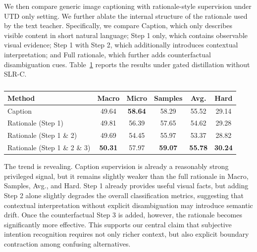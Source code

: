 We then compare generic image captioning with rationale-style supervision under UTD only setting. We further ablate the internal structure of the rationale used by the text teacher. Specifically, we compare Caption, which only describes visible content in short natural language; Step 1 only, which contains observable visual evidence; Step 1 with Step 2, which additionally introduces contextual interpretation; and Full rationale, which further adds counterfactual disambiguation cues. Table~\ref{tab:rationale_ablation} reports the results under gated distillation without SLR-C.
\begin{table}[htbp]
\centering
\caption{}
\label{tab:rationale_ablation}
\begin{tabular}{lccccc}
\hline
Method & Macro & Micro & Samples & Avg. & Hard \\
\hline
Caption & 49.64 & \textbf{58.64} & 58.29 & 55.52 & 29.14 \\
Rationale (Step 1) & 49.81 & 56.39 & 57.65 & 54.62 & 29.28 \\
Rationale (Step 1 \& 2) & 49.69 & 54.45 & 55.97 & 53.37 & 28.82 \\
Rationale (Step 1 \& 2 \& 3) & \textbf{50.31} & 57.97 & \textbf{59.07} & \textbf{55.78} & \textbf{30.24} \\
\hline
\end{tabular}
\end{table}

The trend is revealing. Caption supervision is already a reasonably strong privileged signal, but it remains slightly weaker than the full rationale in Macro, Samples, Avg., and Hard. Step 1 already provides useful visual facts, but adding Step 2 alone slightly degrades the overall classification metrics, suggesting that contextual interpretation without explicit disambiguation may introduce semantic drift. Once the counterfactual Step 3 is added, however, the rationale becomes significantly more effective. This supports our central claim that subjective intention recognition requires not only richer context, but also explicit boundary contraction among confusing alternatives.

\subsubsection{}

